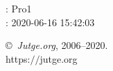 \documentclass[11pt]{article}
\begin{document}
    \newcommand{\SampleTwoCol}{\SampleTwoColInputOutput{sample-000}{}}
    \newcommand{\SampleOneCol}{\SampleOneColInputOutput{sample-000}{}}

    \ProblemInformation
    \Author: Pro1\\    
    \Generation: 2020-06-16 15:42:03

    \bigskip

    \copyright\ \emph{Jutge.org}, 2006--2020. \\
    https:$/\!\!/$jutge.org
\end{document}
